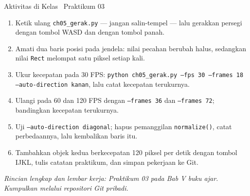 \documentclass[aspectratio=169,10pt]{beamer}
\begin{document}
\begin{frame}{Aktivitas di Kelas \textperiodcentered\ Praktikum 03}
\begin{enumerate}
  \item Ketik ulang \texttt{ch05\_gerak.py} --- jangan salin-tempel --- lalu
        gerakkan persegi dengan tombol WASD dan dengan tombol panah.
  \item Amati dua baris posisi pada jendela: nilai pecahan berubah halus,
        sedangkan nilai \texttt{Rect} melompat satu piksel setiap kali.
  \item Ukur kecepatan pada 30 FPS:
        \texttt{python ch05\_gerak.py --fps 30 --frames 18 --auto-direction
        kanan}, lalu catat kecepatan terukurnya.
  \item Ulangi pada 60 dan 120 FPS dengan \texttt{--frames 36} dan
        \texttt{--frames 72}; bandingkan kecepatan terukurnya.
  \item Uji \texttt{--auto-direction diagonal}; hapus pemanggilan
        \texttt{normalize()}, catat perbedaannya, lalu kembalikan baris itu.
  \item Tambahkan objek kedua berkecepatan 120 piksel per detik dengan tombol
        IJKL, tulis catatan praktikum, dan simpan pekerjaan ke Git.
\end{enumerate}
\vspace{0.10cm}
{\footnotesize\color{ubAccent}\itshape Rincian lengkap dan lembar kerja:
Praktikum 03 pada Bab V buku ajar. Kumpulkan melalui repositori Git pribadi.}
\end{frame}
\end{document}
